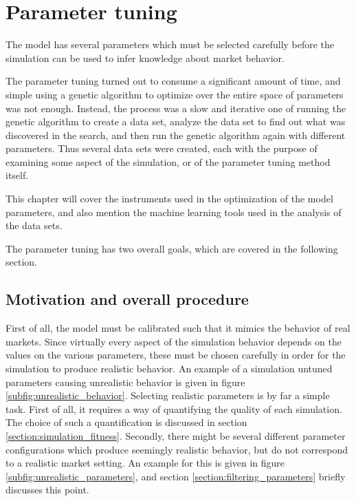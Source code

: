 
\chapter{Parameter tuning} %

	

The model has several parameters which must be selected carefully before the simulation can be used to infer knowledge about market behavior. 

The parameter tuning turned out to consume a significant amount of time, and simple using a genetic algorithm to optimize over the entire space of parameters was not enough. Instead, the process was a slow and iterative one of running the genetic algorithm to create a data set, analyze the data set to find out what was discovered in the search, and then run the genetic algorithm again with different parameters. Thus several data sets were created, each with the purpose of examining some aspect of the simulation, or of the parameter tuning method itself. 

This chapter will cover the instruments used in the optimization of the model parameters, and also mention the machine learning tools used in the analysis of the data sets. 

The parameter tuning has two overall goals, which are covered in the following section.

\section{Motivation and overall procedure}
First of all, the model must be calibrated such that it mimics the behavior of real markets. Since virtually every aspect of the simulation behavior depends on the values on the various parameters, these must be chosen carefully in order for the simulation to produce realistic behavior. An example of a simulation untuned parameters causing  unrealistic behavior is given in figure \ref{subfig:unrealistic_behavior}. Selecting realistic parameters is by far a simple task. First of all, it requires a way of quantifying the quality of each simulation. The choice of such a quantification is discussed in section \ref{section:simulation_fitness}. Secondly, there might be several different parameter configurations which produce seemingly realistic behavior, but do not correspond to a realistic market setting. An example for this is given in figure \ref{subfig:unrealistic_parameters}, and section \ref{section:filtering_parameters} briefly discusses this point. 

